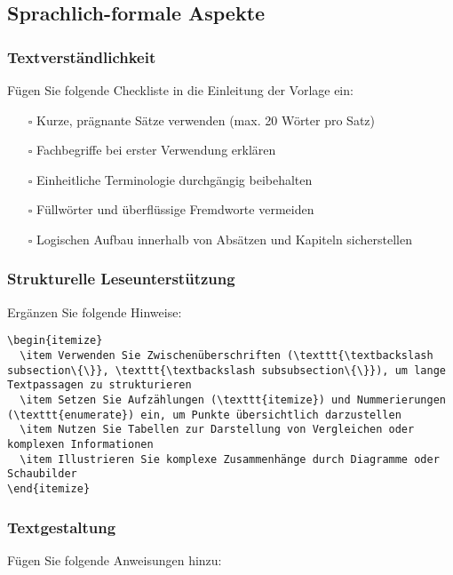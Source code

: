 \documentclass[a4paper,12pt]{article}
\begin{document}
\subsection{Sprachlich-formale Aspekte}

\subsubsection{Textverständlichkeit}
Fügen Sie folgende Checkliste in die Einleitung der Vorlage ein:

\begin{itemize}
  \item[$\square$] Kurze, prägnante Sätze verwenden (max. 20 Wörter pro Satz)
  \item[$\square$] Fachbegriffe bei erster Verwendung erklären
  \item[$\square$] Einheitliche Terminologie durchgängig beibehalten
  \item[$\square$] Füllwörter und überflüssige Fremdworte vermeiden
  \item[$\square$] Logischen Aufbau innerhalb von Absätzen und Kapiteln sicherstellen
\end{itemize}

\subsubsection{Strukturelle Leseunterstützung}
Ergänzen Sie folgende Hinweise:

\begin{lstlisting}
\begin{itemize}
  \item Verwenden Sie Zwischenüberschriften (\texttt{\textbackslash subsection\{\}}, \texttt{\textbackslash subsubsection\{\}}), um lange Textpassagen zu strukturieren
  \item Setzen Sie Aufzählungen (\texttt{itemize}) und Nummerierungen (\texttt{enumerate}) ein, um Punkte übersichtlich darzustellen
  \item Nutzen Sie Tabellen zur Darstellung von Vergleichen oder komplexen Informationen
  \item Illustrieren Sie komplexe Zusammenhänge durch Diagramme oder Schaubilder
\end{itemize}
\end{lstlisting}

\subsubsection{Textgestaltung}
Fügen Sie folgende Anweisungen hinzu:
\end{document}
